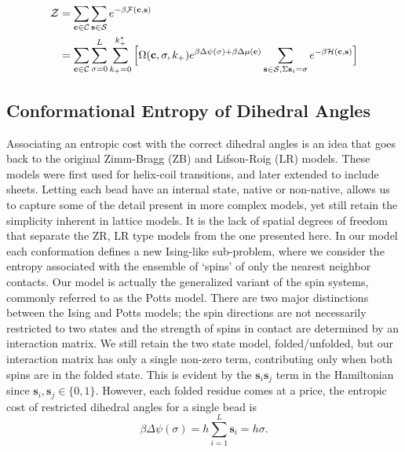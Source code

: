 \begin{align}
\mathcal{Z} 
    &= \sum_{\mathbf{c} \in \mathcal {C}}  \sum_{\mathbf{s} \in \mathcal {S}} 
            e^{-\beta \mathcal{F}(\mathbf{c},\mathbf{s})} \\ \notag 
    &= \sum_{\mathbf{c} \in \mathcal {C}}  \sum_{\sigma = 0}^{L} \sum_{k_+ = 0}^{k_+^*} \Big [
             \Omega(\mathbf{c},\sigma, k_+) e^{ \beta \Delta \psi(\sigma) + \beta \Delta \mu(\mathbf{c}) } 
      \sum_{\mathbf{s} \in \mathcal {S}, \Sigma {\mathbf{s}_i}=\sigma }  
            e^{-\beta \mathcal{H}(\mathbf{c},\mathbf{s})} \Big ] \notag
\end{align}


\subsection{Conformational Entropy of Dihedral Angles}

Associating an entropic cost with the correct dihedral angles is an idea that goes back to the original Zimm-Bragg (ZB) \cite{zimm_theory_1959} and Lifson-Roig (LR) models.\cite{lifson_theory_1961} These models were first used for helix-coil transitions, and later extended to include sheets.\cite{mattice_matrix_1984, hong_statistical_2008, schreck_exactly_2010} Letting each bead have an internal state, native or non-native, allows us to capture some of the detail present in more complex models, yet still retain the simplicity inherent in lattice models. It is the lack of spatial degrees of freedom that separate the ZR, LR type models from the one presented here. In our model each conformation defines a new Ising-like sub-problem, where we consider the entropy associated with the ensemble of `spins' of only the nearest neighbor contacts. 
Our model is actually the generalized variant of the spin systems, commonly referred to as the Potts model. There are two major distinctions between the Ising and Potts models; the spin directions are not necessarily restricted to two states and the strength of spins in contact are determined by an interaction matrix. We still retain the two state model, folded/unfolded, but our interaction matrix has only a single non-zero term, contributing only when both spins are in the folded state. This is evident by the $\mathbf{s}_i \mathbf{s}_j$ term in the Hamiltonian since $\mathbf{s}_i, \mathbf{s}_j \in \{0,1\}$. However, each folded residue comes at a price, the entropic cost of restricted dihedral angles for a single bead is
\begin{equation}
\beta \Delta \psi(\sigma) = h \sum_{i=1}^L \mathbf{s}_i = h \sigma
.
\end{equation}

